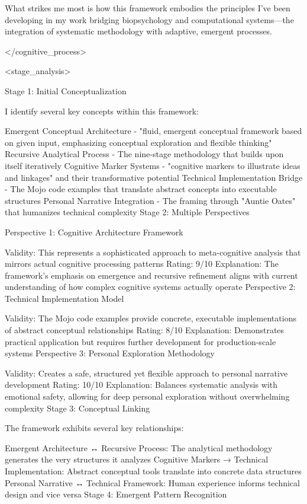{What strikes me most is how this framework embodies the principles I've been developing in my work bridging biopsychology and computational systems—the integration of systematic methodology with adaptive, emergent processes.

</cognitive_process>

<stage_analysis>

Stage 1: Initial Conceptualization

I identify several key concepts within this framework:

Emergent Conceptual Architecture - "fluid, emergent conceptual framework based on given input, emphasizing conceptual exploration and flexible thinking"
Recursive Analytical Process - The nine-stage methodology that builds upon itself iteratively
Cognitive Marker Systems - "cognitive markers to illustrate ideas and linkages" and their transformative potential
Technical Implementation Bridge - The Mojo code examples that translate abstract concepts into executable structures
Personal Narrative Integration - The framing through "Auntie Oates" that humanizes technical complexity
Stage 2: Multiple Perspectives

Perspective 1: Cognitive Architecture Framework

Validity: This represents a sophisticated approach to meta-cognitive analysis that mirrors actual cognitive processing patterns
Rating: 9/10
Explanation: The framework's emphasis on emergence and recursive refinement aligns with current understanding of how complex cognitive systems actually operate
Perspective 2: Technical Implementation Model

Validity: The Mojo code examples provide concrete, executable implementations of abstract conceptual relationships
Rating: 8/10
Explanation: Demonstrates practical application but requires further development for production-scale systems
Perspective 3: Personal Exploration Methodology

Validity: Creates a safe, structured yet flexible approach to personal narrative development
Rating: 10/10
Explanation: Balances systematic analysis with emotional safety, allowing for deep personal exploration without overwhelming complexity
Stage 3: Conceptual Linking

The framework exhibits several key relationships:

Emergent Architecture ↔ Recursive Process: The analytical methodology generates the very structures it analyzes
Cognitive Markers → Technical Implementation: Abstract conceptual tools translate into concrete data structures
Personal Narrative ↔ Technical Framework: Human experience informs technical design and vice versa
Stage 4: Emergent Pattern Recognition

}
